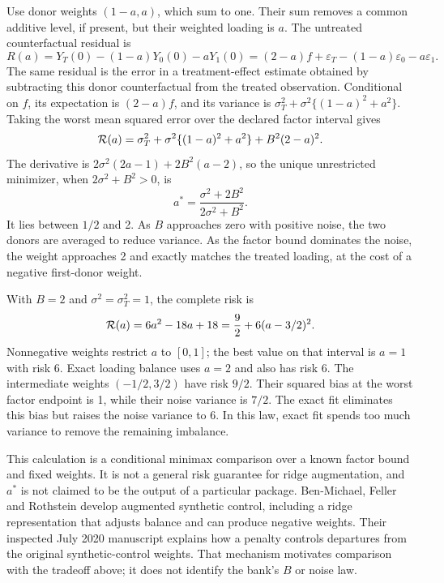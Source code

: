 Use donor weights $(1-a,a)$, which sum to one. Their sum removes a common
additive level, if present, but their weighted loading is $a$. The untreated
counterfactual residual is
\begin{equation}
 R(a)=Y_T(0)-(1-a)Y_0(0)-aY_1(0)
      =(2-a)f+\varepsilon_T-(1-a)\varepsilon_0-a\varepsilon_1.
 \label{exec17:s6-donor-residual}
\end{equation}
The same residual is the error in a treatment-effect estimate obtained by
subtracting this donor counterfactual from the treated observation. Conditional
on $f$, its expectation is $(2-a)f$, and its variance is
$\sigma_T^2+\sigma^2\{(1-a)^2+a^2\}$. Taking the worst mean squared
error over the declared factor interval gives
\begin{equation}
 {\cal R}(a)=\sigma_T^2+\sigma^2\{(1-a)^2+a^2\}
                         +B^2(2-a)^2.
 \label{exec17:s6-donor-risk}
\end{equation}
The derivative is
$2\sigma^2(2a-1)+2B^2(a-2)$, so the unique unrestricted minimizer,
when $2\sigma^2+B^2>0$, is
\begin{equation}
 a^*=\frac{\sigma^2+2B^2}{2\sigma^2+B^2}.
 \label{exec17:s6-donor-optimum}
\end{equation}
It lies between $1/2$ and 2. As $B$ approaches zero with positive
noise, the two donors are averaged to reduce variance. As the factor bound
dominates the noise, the weight approaches 2 and exactly matches the
treated loading, at the cost of a negative first-donor weight.

With $B=2$ and $\sigma^2=\sigma_T^2=1$, the complete risk is
\begin{equation}
 {\cal R}(a)=6a^2-18a+18
            =\frac92+6(a-3/2)^2.
 \label{exec17:s6-donor-square}
\end{equation}
Nonnegative weights restrict $a$ to $[0,1]$; the best value on that
interval is $a=1$ with risk 6. Exact loading balance uses $a=2$
and also has risk 6. The intermediate weights $(-1/2,3/2)$ have
risk $9/2$. Their squared bias at the worst factor endpoint is 1,
while their noise variance is $7/2$. The exact fit eliminates this bias
but raises the noise variance to 6. In this law, exact fit spends too much
variance to remove the remaining imbalance.

This calculation is a conditional minimax comparison over a known factor
bound and fixed weights. It is not a general risk guarantee for ridge
augmentation, and $a^*$ is not claimed to be the output of a particular
package. Ben-Michael, Feller and Rothstein develop augmented synthetic control,
including a ridge representation that adjusts balance and can produce
negative weights. Their inspected July 2020 manuscript explains how a penalty
controls departures from the original synthetic-control weights. That
mechanism motivates comparison with the tradeoff above; it does not identify
the bank's $B$ or noise law.~\citep{benmichael2021}

